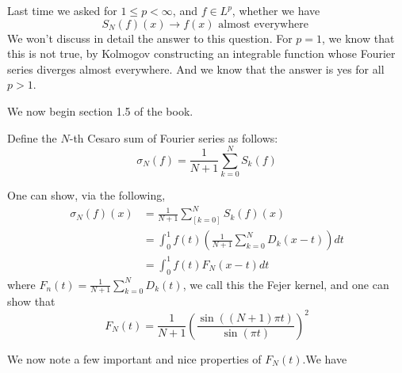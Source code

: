 Last time we asked for $1\leq p<\infty$, and $f\in L^p$, whether we have
\begin{equation*}
    S_N(f)(x)\to f(x) \text{ almost everywhere }
\end{equation*}
We won't discuss in detail the answer to this question. For $p=1$, we know that this is not true, by Kolmogov constructing an integrable function whose Fourier series diverges almost everywhere. And we know that the answer is yes for all $p>1$.

We now begin section 1.5 of the book.
\begin{definition}
    Define the $N$-th Cesaro sum of Fourier series as follows:
    \begin{equation*}
        \sigma_N(f)=\frac{1}{N+1}\sum_{k=0}^NS_k(f)
    \end{equation*}
\end{definition}
One can show, via the following,
\begin{align*}
    \sigma_N(f)(x)&=\frac{1}{N+1}\sum_[k=0]^NS_k(f)(x)\\
    &=\int_0^1f(t)\left(\frac{1}{N+1}\sum_{k=0}^ND_k(x-t) \right)dt\\
    &=\int_0^1f(t)F_N(x-t)dt
\end{align*}
where $F_n(t)=\frac{1}{N+1}\sum_{k=0}^ND_k(t)$, we call this the Fejer kernel, and one can show that 
\begin{equation*}
    F_N(t)=\frac{1}{N+1}\left(\frac{\sin((N+1)\pi t)}{\sin(\pi t)} \right)^2
\end{equation*}

We now note a few important and nice properties of $F_N(t)$.We have